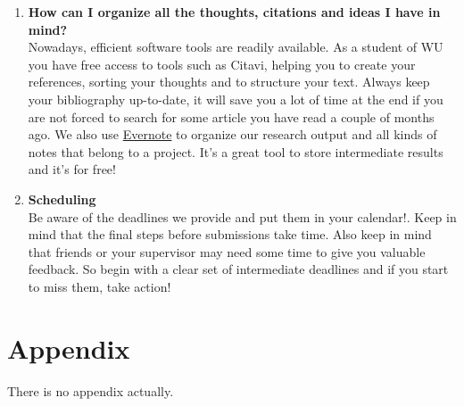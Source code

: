 \documentclass[a4paper, 12pt]{article}
\begin{document}
\begin{enumerate}
		\item \textbf{How can I organize all the thoughts, citations and ideas I have in mind?} \\
		Nowadays, efficient software tools are readily available. As a student of WU you have free access to tools such as Citavi, helping you to create your references, sorting your thoughts and to structure your text. Always keep your bibliography up-to-date, it will save you a lot of time at the end if you are not forced to search for some article you have read a couple of months ago. We also use \href{https://evernote.com/intl/de/}{Evernote} to organize our research output and all kinds of notes that belong to a project. It's a great tool to store intermediate results and it's for free!
		
		\item \textbf{Scheduling}\\
		Be aware of the deadlines we provide and put them in your calendar!. Keep in mind that the final steps before submissions take time. Also keep in mind that friends or your supervisor may need some time to give you valuable feedback. So begin with a clear set of intermediate deadlines and if you start to miss them, take action! 
	\end{enumerate}

	
	
	\appendix
	\section{Appendix}
	There is no appendix actually.	

\end{document}
